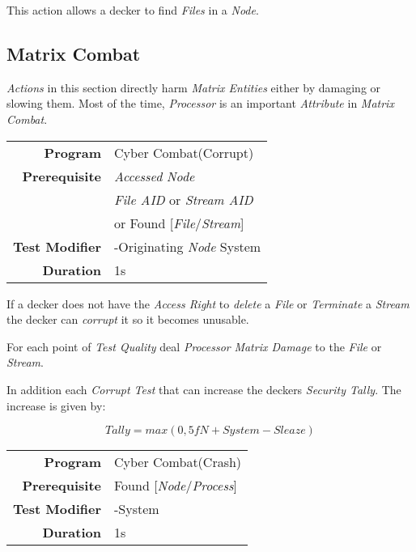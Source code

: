 \hfill

This action allows a decker to find \emph{Files} in a \emph{Node}.

\subsection{Matrix Combat}
\label{subsec:matrix combat}

\emph{Actions} in this section directly harm \emph{Matrix Entities} either by
damaging or slowing them. Most of the time, \emph{Processor} is an important
\emph{Attribute} in \emph{Matrix Combat}.

\label{par:corrupt action}

\begin{tabular}{rl}
    \textbf{Program}       & Cyber Combat(Corrupt)                \\
    \textbf{Prerequisite}  & \emph{Accessed} \emph{Node}          \\
                           & \emph{File AID} or \emph{Stream AID} \\
                           & or Found [\emph{File}/\emph{Stream}] \\
    \textbf{Test Modifier} & -Originating \emph{Node} System      \\
    \textbf{Duration}      & 1s                                   \\
\end{tabular}

\hfill

If a decker does not have the \emph{Access Right} to \emph{delete} a \emph{File}
or \emph{Terminate} a \emph{Stream} the decker can \emph{corrupt} it so it becomes
unusable.

For each point of \emph{Test Quality} deal \emph{Processor} \emph{Matrix Damage}
to the \emph{File} or \emph{Stream}.

In addition each \emph{Corrupt Test} that can increase the deckers
\emph{Security Tally}.
The increase is given by:

\begin{equation*}
    \textit{Tally} = max(0, \textit{5fN} + \textit{System} - \textit{Sleaze})
\end{equation*}

\label{par:crash}

\begin{tabular}{rl}
    \textbf{Program}       & Cyber Combat(Crash)                \\
    \textbf{Prerequisite}  & Found [\emph{Node}/\emph{Process}] \\
    \textbf{Test Modifier} & -System                            \\
    \textbf{Duration}      & 1s                                 \\
\end{tabular}

